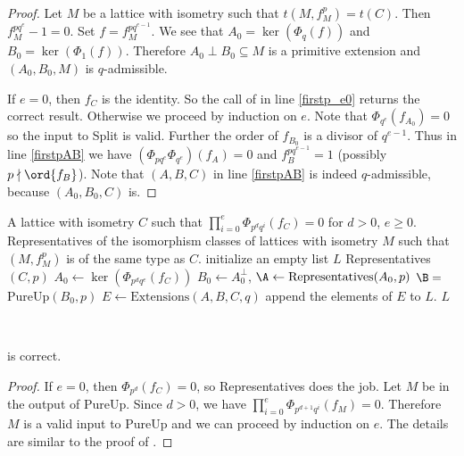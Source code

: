 \begin{proof}
Let $M$ be a lattice with isometry such that $t(M,f_M^p)=t(C)$. Then $f_M^{pq^e}-1=0$.
Set $f=f_M^{pq^{e-1}}$. We see that $A_0= \ker(\Phi_q(f))$
and $B_0 = \ker(\Phi_1(f))$. Therefore $A_0 \perp B_0 \subseteq M$ is a primitive extension
and $(A_0,B_0,M)$ is $q$-admissible.

If $e=0$, then $f_C$ is the identity. So the call of  in line \ref{firstp_e0} returns the correct result.
Otherwise we proceed by induction on $e$. Note that $\Phi_{q^e}(f_{A_0})= 0$ so
the input to Split is valid. Further the order of $f_{B_0}$ is a divisor of $q^{e-1}$. Thus in line \ref{firstpAB} we have $(\Phi_{pq^e}\Phi_{q^e})(f_A)=0$
and $f_B^{pq^{e-1}} = 1$ (possibly $p \nmid \ord{f_B}$).
  Note that $(A,B,C)$ in line \ref{firstpAB} is indeed $q$-admissible, because $(A_0,B_0,C)$ is.
\end{proof}


\begingroup
{}\label{PureP}
\endgroup
\begin{algorithmic}[1]
\REQUIRE A lattice with isometry $C$ such that $\prod_{i=0}^e\Phi_{p^dq^i}(f_C)=0$ for $d>0$, $e\geq 0$.
\ENSURE Representatives of the isomorphism classes of lattices with isometry $M$ such that $(M,f_M^p)$ is of the same type as $C$.
\STATE initialize an empty list $L$
\RETURN Representatives$(C,p)$
\ENDIF
\STATE $A_0 \gets \ker(\Phi_{p^dq^e}(f_C))$
\STATE $B_0 \gets A_0^\perp$,
\STATE $\A\gets \mbox{Representatives}(A_0,p)$
\STATE $\B = $ PureUp$(B_0,p)$
    \STATE $E \gets \mbox{Extensions}(A,B,C,q)$
    \STATE append the elements of $E$ to $L$.
\ENDFOR
\RETURN $L$
\end{algorithmic}\hrulefill\\

\begin{lemma}
 is correct.
\end{lemma}
\begin{proof}
If $e=0$, then $\Phi_{p^d}(f_C)=0$, so Representatives does the job.
Let $M$ be in the output of PureUp. Since $d>0$, we have $\prod_{i=0}^e\Phi_{p^{d+1}q^i}(f_M)=0$. Therefore $M$ is a valid input to PureUp and we can proceed by induction on $e$. The details are
similar to the proof of .
\end{proof}

